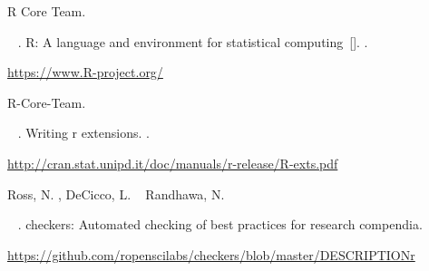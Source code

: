 \documentclass[APA,LATO1COL]{WileyNJD-v2}\usepackage[]{graphicx}\usepackage[]{color}
\begin{document}
\begin{thebibliography}{}
%
\begin{APACrefauthors}%
{R Core Team}.%
\end{APACrefauthors}%
\unskip\
\newblock
{}.
\newblock
{\BBOQ}
  {R: A language and environment for statistical computing}{\BBCQ}\
  [\bibcomputersoftwaremanual].
\newblock
{}.
\newblock
\begin{APACrefURL} \url{https://www.R-project.org/} \end{APACrefURL}
\PrintBackRefs{\CurrentBib}

%
\begin{APACrefauthors}%
R-Core-Team.%
\end{APACrefauthors}%
\unskip\
\newblock
{}.
\newblock
{\BBOQ} {Writing r extensions}.{\BBCQ}
\newblock
{}.
\newblock
\begin{APACrefURL}
  \url{http://cran.stat.unipd.it/doc/manuals/r-release/R-exts.pdf}
  \end{APACrefURL}
\PrintBackRefs{\CurrentBib}

%
\begin{APACrefauthors}%
Ross, N.%
, DeCicco, L.%
\BCBL {}\ \BBA {} Randhawa, N.%
\end{APACrefauthors}%
\unskip\
\newblock
\APACrefYearMonthDay{2018}{}{}.
\newblock
{} {checkers: Automated checking of best practices for research
  compendia.}
\newblock
\begin{APACrefURL}
  \url{https://github.com/ropenscilabs/checkers/blob/master/DESCRIPTIONr}
  \end{APACrefURL}
\newblock
{}
\PrintBackRefs{\CurrentBib}


\end{thebibliography}
\end{document}
